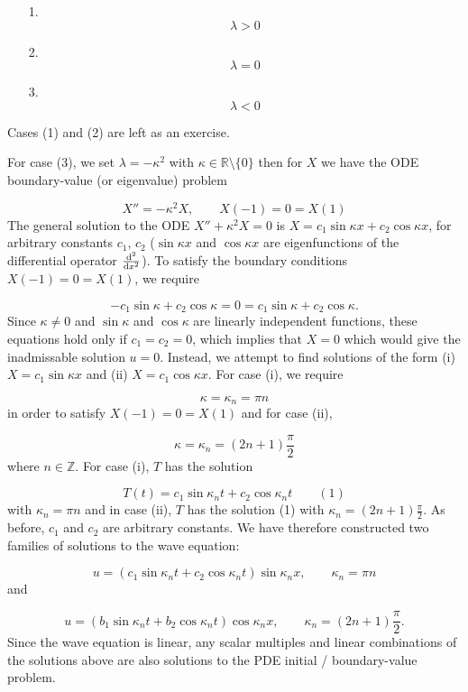 \documentclass[12pt,a4paper]{article}
\begin{document}
\begin{itemize}
\item[1. ] \[
\lambda > 0
\]

\item[2. ] \[
\lambda = 0
\]

\item[3. ] \[
\lambda < 0
\]
\end{itemize}
Cases (1) and (2) are left as an exercise. 

For case (3), we set $\lambda = - \kappa^2$ with $\kappa \in \mathbb{R}\setminus \{0\}$ then for $X$ we have the ODE boundary-value (or eigenvalue) problem

\[
X'' = -\kappa^2 X, \qquad X(-1) = 0 = X(1)
\]
The general solution to the ODE $X''+\kappa^2 X = 0$ is $X = c_1 \sin\kappa x + c_2\cos\kappa x$, for arbitrary constants $c_1$, $c_2$ ($\sin\kappa x$ and $\cos\kappa x$ are eigenfunctions of the differential operator $\frac{{\rm d}^2}{{\rm d}x^2}$). To satisfy the boundary conditions $X(-1) = 0 = X(1)$, we require

\[
-c_1 \sin\kappa + c_2\cos\kappa = 0 = c_1 \sin\kappa  + c_2\cos\kappa .
\]
Since $\kappa \neq 0$ and $\sin \kappa$ and $\cos \kappa$ are linearly independent functions, these equations hold only if $c_1 = c_2 = 0$, which implies that $X=0$ which would give the inadmissable solution $u = 0$.  Instead, we attempt to find solutions of the form (i) $X = c_1 \sin\kappa x$  and (ii) $X = c_1 \cos\kappa x$.  For case (i), we require

\[
    \kappa = \kappa_n = \pi n
\]
in order to satisfy $X(-1) = 0 = X(1)$ and for case (ii),

\[
\kappa = \kappa_n = (2n + 1)\frac{\pi}{2}
\]
where $n \in \mathbb{Z}$.  For case (i), $T$ has the solution

\[
T(t) = c_1 \sin\kappa_n t + c_2\cos\kappa_n t   \qquad (1)
\]
with $\kappa_n = \pi n$ and in case (ii), $T$ has the solution (1) with $\kappa_n = (2n + 1)\frac{\pi}{2}$.  As before, $c_1$ and $c_2$ are arbitrary constants.  We have therefore constructed two families of solutions to the wave equation:

\[
u = \left( c_1 \sin\kappa_n t + c_2\cos\kappa_n t \right)\sin \kappa_n x, \qquad \kappa_n = \pi n
\]
and

\[
u = \left( b_1 \sin\kappa_n t + b_2\cos\kappa_n t \right)\cos \kappa_n x, \qquad \kappa_n =(2n + 1)\frac{\pi}{2}.
\]
Since the wave equation is linear, any scalar multiples and linear combinations of the solutions above are also solutions to the PDE initial / boundary-value problem. 
\end{document}
